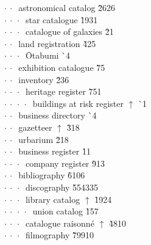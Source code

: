 \begin{tabbing}
$\cdot\:\cdot\:$  astronomical catalog  \` 26{\raisebox{.4\height}{\scalebox{.6}{+}}}26\\
$\cdot\:\cdot\:\cdot\:$  star catalogue  \` 19{\raisebox{.4\height}{\scalebox{.6}{+}}}31\\
$\cdot\:\cdot\:\cdot\:$  catalogue of galaxies  \` 2{\raisebox{.4\height}{\scalebox{.6}{+}}}1\\
$\cdot\:\cdot\:$  land registration  \` 4{\raisebox{.4\height}{\scalebox{.6}{+}}}25\\
$\cdot\:\cdot\:\cdot\:$  Ōtabumi  \` {\raisebox{.4\height}{\scalebox{.6}{+}}}4\\
$\cdot\:\cdot\:$  exhibition catalogue  \` 7{\raisebox{.4\height}{\scalebox{.6}{+}}}5\\
$\cdot\:\cdot\:$  inventory  \` 2{\raisebox{.4\height}{\scalebox{.6}{+}}}36\\
$\cdot\:\cdot\:\cdot\:$  heritage register  \` 75{\raisebox{.4\height}{\scalebox{.6}{+}}}1\\
$\cdot\:\cdot\:\cdot\:\cdot\:$  buildings at risk register $\uparrow$ \` {\raisebox{.4\height}{\scalebox{.6}{+}}}1\\
$\cdot\:\cdot\:$  business directory  \` {\raisebox{.4\height}{\scalebox{.6}{+}}}4\\
$\cdot\:\cdot\:$  gazetteer $\uparrow$ \` 3{\raisebox{.4\height}{\scalebox{.6}{+}}}18\\
$\cdot\:\cdot\:$  urbarium  \` 2{\raisebox{.4\height}{\scalebox{.6}{+}}}18\\
$\cdot\:\cdot\:$  business register  \` 1{\raisebox{.4\height}{\scalebox{.6}{+}}}1\\
$\cdot\:\cdot\:\cdot\:$  company register  \` 9{\raisebox{.4\height}{\scalebox{.6}{+}}}13\\
$\cdot\:\cdot\:$  bibliography  \` 610{\raisebox{.4\height}{\scalebox{.6}{+}}}6\\
$\cdot\:\cdot\:\cdot\:$  discography  \` 5543{\raisebox{.4\height}{\scalebox{.6}{+}}}35\\
$\cdot\:\cdot\:\cdot\:$  library catalog $\uparrow$ \` 19{\raisebox{.4\height}{\scalebox{.6}{+}}}24\\
$\cdot\:\cdot\:\cdot\:\cdot\:$  union catalog  \` 15{\raisebox{.4\height}{\scalebox{.6}{+}}}7\\
$\cdot\:\cdot\:\cdot\:$  catalogue raisonné $\uparrow$ \` 48{\raisebox{.4\height}{\scalebox{.6}{+}}}10\\
$\cdot\:\cdot\:\cdot\:$  filmography  \` 799{\raisebox{.4\height}{\scalebox{.6}{+}}}10\\

\end{tabbing}
